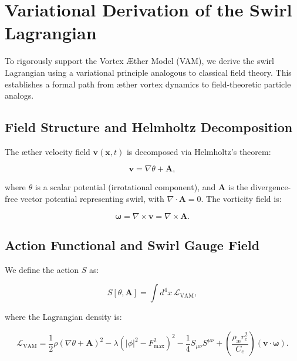 \section{Variational Derivation of the Swirl Lagrangian}

To rigorously support the Vortex Æther Model (VAM), we derive the swirl Lagrangian using a variational principle analogous to classical field theory. This establishes a formal path from æther vortex dynamics to field-theoretic particle analogs.

\subsection{Field Structure and Helmholtz Decomposition}

The æther velocity field $\mathbf{v}(\mathbf{x}, t)$ is decomposed via Helmholtz's theorem:

\begin{equation}
\mathbf{v} = \nabla \theta + \mathbf{A},
\end{equation}

where $\theta$ is a scalar potential (irrotational component), and $\mathbf{A}$ is the divergence-free vector potential representing swirl, with $\nabla \cdot \mathbf{A} = 0$. The vorticity field is:

\begin{equation}
\boldsymbol{\omega} = \nabla \times \mathbf{v} = \nabla \times \mathbf{A}.
\end{equation}

\subsection{Action Functional and Swirl Gauge Field}

We define the action $S$ as:

\begin{equation}
S[\theta, \mathbf{A}] = \int d^4x \, \mathcal{L}_{\text{VAM}},
\end{equation}

where the Lagrangian density is:

\begin{equation}
\mathcal{L}_{\text{VAM}} = \frac{1}{2} \rho (\nabla \theta + \mathbf{A})^2 - \lambda (|\phi|^2 - F_{\text{max}}^2)^2 - \frac{1}{4} S_{\mu\nu} S^{\mu\nu} + \left( \frac{\rho_{\text{æ}} r_c^2}{C_e} \right) (\mathbf{v} \cdot \boldsymbol{\omega}).
\end{equation}

